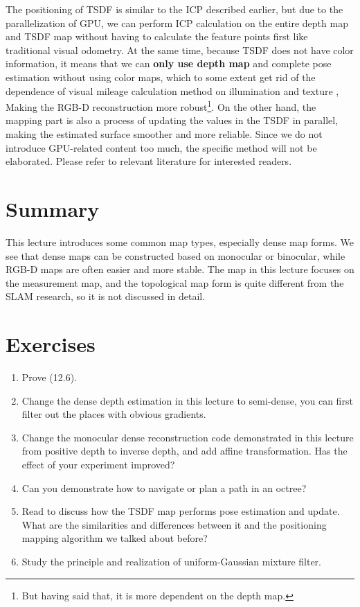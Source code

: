 The positioning of TSDF is similar to the ICP described earlier, but due to the parallelization of GPU, we can perform ICP calculation on the entire depth map and TSDF map without having to calculate the feature points first like traditional visual odometry. At the same time, because TSDF does not have color information, it means that we can \textbf{only use depth map} and complete pose estimation without using color maps, which to some extent get rid of the dependence of visual mileage calculation method on illumination and texture , Making the RGB-D reconstruction more robust\footnote{But having said that, it is more dependent on the depth map. }. On the other hand, the mapping part is also a process of updating the values ​​in the TSDF in parallel, making the estimated surface smoother and more reliable. Since we do not introduce GPU-related content too much, the specific method will not be elaborated. Please refer to relevant literature for interested readers.

\section{Summary}
This lecture introduces some common map types, especially dense map forms. We see that dense maps can be constructed based on monocular or binocular, while RGB-D maps are often easier and more stable. The map in this lecture focuses on the measurement map, and the topological map form is quite different from the SLAM research, so it is not discussed in detail.

\section*{Exercises}
\begin{enumerate}
	\item Prove (12.6).
	\item Change the dense depth estimation in this lecture to semi-dense, you can first filter out the places with obvious gradients.
	\item[\optional] Change the monocular dense reconstruction code demonstrated in this lecture from positive depth to inverse depth, and add affine transformation. Has the effect of your experiment improved?
	\item Can you demonstrate how to navigate or plan a path in an octree?
	\item Read \cite{Newcombe2011} to discuss how the TSDF map performs pose estimation and update. What are the similarities and differences between it and the positioning mapping algorithm we talked about before?
	\item[\optional] Study the principle and realization of uniform-Gaussian mixture filter.
\end{enumerate}
